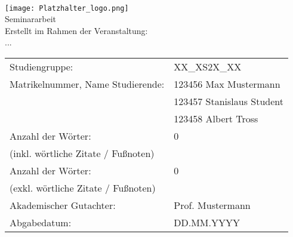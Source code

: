 \begin{center}
     \\[3ex]
    \texttt{[image: Platzhalter\_logo.png]} \\[3ex]%
    \large{Seminararbeit} \\ [-10pt]%
    \large{Erstellt im Rahmen der Veranstaltung:} \\ [-10pt]
    \large{...}
\end{center}

\renewcommand{\arraystretch}{2.5}
\begin{table}[h]
    \setlength{\tabcolsep}{22pt}
    \begin{tabularx}{\textwidth}{l l}
        Studiengruppe:                      & XX\_XS2X\_XX              \\
        Matrikelnummer, Name Studierende:   & 123456 Max Mustermann     \\ [-15pt]
        ~                                   & 123457 Stanislaus Student \\ [-15pt]
        ~                                   & 123458 Albert Tross       \\
        Anzahl der Wörter:                  & 0                         \\ [-15pt]
        (inkl. wörtliche Zitate / Fußnoten) & ~                         \\
        Anzahl der Wörter:                  & 0                         \\ [-15pt]
        (exkl. wörtliche Zitate / Fußnoten) & ~                         \\
        Akademischer Gutachter:             & Prof. Mustermann          \\
        Abgabedatum:                        & DD.MM.YYYY                \\
    \end{tabularx}
\end{table}

\newpage